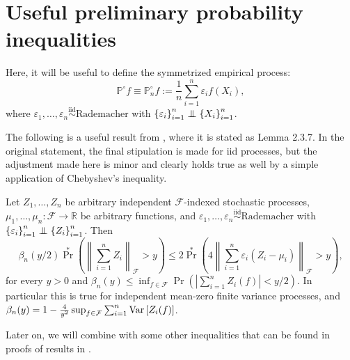 
\section{Useful preliminary probability inequalities}

Here, it will be useful to define the symmetrized empirical process:
\begin{equation*}
  \mathbb{P}^{\circ} f \equiv \mathbb{P}^{\circ}_{n} f := \frac{1}{n} \sum_{i =
  1}^{n} \varepsilon_{i} f \left( X_{i} \right),
\end{equation*}
where \(\varepsilon_{1}, \dots, \varepsilon_{n} \overset{\mathrm{iid}}{\sim}
\text{Rademacher}\) with \(\left\{ \varepsilon_{i} \right\}_{i = 1}^{n} \mathrel{\perp \mspace{-11mu} \perp}
\left\{ X_{i} \right\}_{i = 1}^{n}\).

The following is a useful result from
\citet{2023vandervaartWeakConvergenceEmpirical}, where it is stated as Lemma
2.3.7.
In the original statement, the final stipulation is made for iid processes, but
the adjustment made here is minor and clearly holds true as well by a simple
application of Chebyshev's inequality.

\begin{lemma}
\label{lem--vdvw23-lem-2-3-7}
Let \(Z_{1}, \dots, Z_{n}\) be arbitrary independent \(\mathcal{F}\)-indexed
stochastic processes, \(\mu_{1}, \dots, \mu_{n} : \mathcal{F} \to \mathbb{R}\)
be arbitrary functions, and \(\varepsilon_{1}, \dots, \varepsilon_{n}
\overset{\mathrm{iid}}{\sim}
\text{Rademacher}\) with \(\left\{ \varepsilon_{i} \right\}_{i = 1}^{n} \mathrel{\perp \mspace{-11mu} \perp}
\left\{ Z_{i} \right\}_{i = 1}^{n}\).
Then
\begin{equation}
  \beta_{n} (y / 2) \Pr^{\ast} \left( \left\| \sum_{i = 1}^{n} Z_{i}
  \right\|_{\mathcal{F}} > y \right) \leq 2 \Pr^{\ast} \left( 4 \left\| \sum_{i
  = 1}^{n} \varepsilon_{i} \left( Z_{i} - \mu_{i} \right) \right\|_{\mathcal{F}}
  > y \right),
  \label{eqn--vdvw23-lem--2-3-7}
\end{equation}
for every \(y > 0\) and \(\beta_{n} (y) \leq \inf_{f \in \mathcal{F}} \Pr \left(
\left| \sum_{i = 1}^{n} Z_{i} (f) \right| < y / 2 \right)\).
In particular this is true for independent mean-zero finite variance processes,
and \(\beta_{n} (y) = 1 - \frac{4}{y^{2}} \sup_{f \in \mathcal{F}} \sum_{i =
1}^{n} \mathrm{Var} \left[ Z_{i} (f) \right]\).
\end{lemma}

Later on, we will combine  with some other
inequalities that can be found in proofs of results in
\citet{1984pollardConvergenceStochasticProcesses}.


